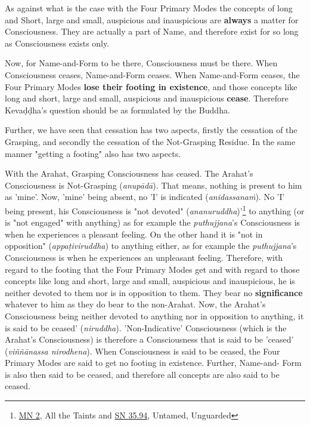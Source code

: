As against what is the case with the Four Primary Modes the concepts of long and Short, large and small, auspicious and inauspicious are \textbf{always} a matter for Consciousness. They are actually a part of Name, and therefore exist for so long as Consciousness exists only.

Now, for Name-and-Form to be there, Consciousness must be there. When Consciousness ceases, Name-and-Form ceases. When Name-and-Form ceases, the Four Primary Modes \textbf{lose their footing in existence}, and those concepts like long and short, large and small, auspicious and inauspicious \textbf{cease}. Therefore Kevaḍḍha's question should be as formulated by the Buddha.

Further, we have seen that cessation has two aspects, firstly the cessation of the Grasping, and secondly the cessation of the Not-Grasping Residue. In the same manner "getting a footing" also has two aspects.

With the Arahat, Grasping Consciousness has ceased. The Arahat's Consciousness is Not-Grasping (\emph{anupādā}). That means, nothing is present to him as 'mine'. Now, 'mine' being absent, no 'I' is indicated (\emph{anidassanaṁ}). No 'I' being present, his Consciousness is "not devoted" (\emph{ananuruddha})'\footnote{\href{https://suttacentral.net/mn2/en/bodhi}{MN 2}, All the Taints and \href{https://suttacentral.net/sn35.94/en/bodhi}{SN 35.94}, Untamed, Unguarded} to anything (or is "not engaged" with anything) as for example the \emph{puthujjana}'s Consciousness is when he experiences a pleasant feeling. On the other hand it is "not in opposition" (\emph{appaṭiviruddha}) to anything either, as for example the \emph{puthujjana}'s Consciousness is when he experiences an unpleasant feeling. Therefore, with regard to the footing that the Four Primary Modes get and with regard to those concepts like long and short, large and small, auspicious and inauspicious, he is neither devoted to them nor is in opposition to them. They bear no \textbf{significance} whatever to him as they do bear to the non-Arahat. Now, the Arahat's Consciousness being neither devoted to anything nor in opposition to anything, it is said to be ceased' (\emph{niruddha}). 'Non-Indicative' Consciousness (which is the Arahat's Consciousness) is therefore a Consciousness that is said to be 'ceased' (\emph{viññānassa nirodhena}). When Consciousness is said to be ceased, the Four Primary Modes are said to get no footing in existence. Further, Name-and- Form is also then said to be ceased, and therefore all concepts are also said to be ceased.

